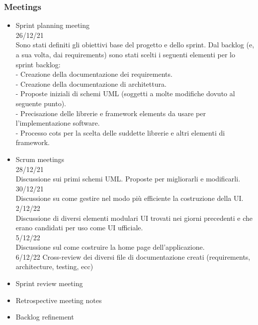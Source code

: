 \documentclass{article}
\begin{document}
\subsubsection{Meetings}
\begin{itemize}
\item Sprint planning meeting 
\\26/12/21 
\\Sono stati definiti gli obiettivi base del progetto e dello sprint. Dal backlog (e, a sua volta, dai requirements) sono stati scelti i seguenti elementi per lo sprint backlog:
\\-	Creazione della documentazione dei requirements.
\\-	Creazione della documentazione di architettura.
\\-	Proposte iniziali di schemi UML (soggetti a molte modifiche dovuto al seguente punto).
\\-	Precisazione delle librerie e framework elements da usare per l’implementazione software.
\\-	Processo cots per la scelta delle suddette librerie e altri elementi di framework.

\item Scrum meetings
\\28/12/21 
\\Discussione sui primi schemi UML. Proposte per migliorarli e modificarli.
\\30/12/21
\\Discussione su come gestire nel modo più efficiente la costruzione della UI.
\\2/12/22
\\Discussione di diversi elementi modulari UI trovati nei giorni precedenti e che erano candidati per uso come UI ufficiale. 
\\5/12/22
\\Discussione sul come costruire la home page dell’applicazione.
\\6/12/22
Cross-review dei diversi file di documentazione creati (requirements, architecture, testing, ecc) 
\item Sprint review meeting 
\item Retrospective meeting notes
\item Backlog refinement
\end{itemize}
\end{document}
